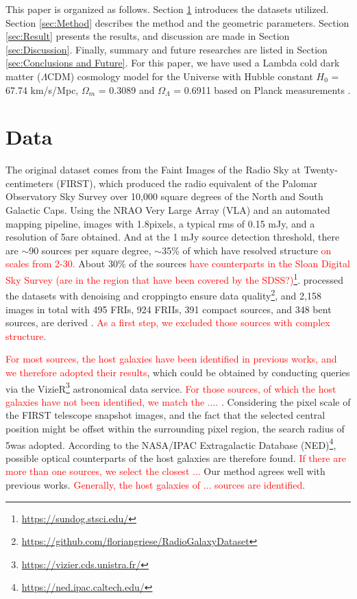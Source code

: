 \documentclass{aa}
\begin{document}
This paper is organized as follows. Section \ref{sec:Data} introduces the datasets utilized. Section \ref{sec:Method} describes the method and the geometric parameters. Section \ref{sec:Result} presents the results, and discussion are made in Section \ref{sec:Discussion}. Finally, summary and future researches are listed in Section \ref{sec:Conclusions and Future}.
For this paper, we have used a Lambda cold dark matter ($ \Lambda\text{CDM} $) cosmology model for the Universe with Hubble constant $H_{0}$ = 67.74 km/s/Mpc, $\Omega_m$ = 0.3089 and $\Omega_\Lambda$ = 0.6911 based on Planck measurements \citep{collaboration_planck_2016}.



\section{Data}\label{sec:Data}
The original dataset comes from the Faint Images of the Radio Sky at Twenty-centimeters (FIRST), 
which produced the radio equivalent of the Palomar Observatory Sky Survey over 10,000 square degrees of the North and South Galactic Caps.
Using the NRAO Very Large Array (VLA) and an automated mapping pipeline, images with 1.8\arcsec pixels, a typical rms of 0.15 mJy, and a resolution of 5\arcsec are obtained.
And at the 1 mJy source detection threshold, there are $\sim$90 sources per square degree, $\sim$35\% of which have resolved structure \textcolor{red}{on scales from 2-30\arcsec. }
About 30\% of the sources \textcolor{red}{have counterparts in the Sloan Digital Sky Survey (are in the region that have been covered by the SDSS?)}\footnote{\url{https://sundog.stsci.edu/}}. 
\cite{griese_first_2023} processed the datasets with denoising and cropping\textemdash to ensure data quality\footnote{\url{https://github.com/floriangriese/RadioGalaxyDataset}},
and 2,158 images in total with 495 FRIs, 924 FRIIs, 391 compact sources, and 348 bent sources, are derived \citep{griese_floriangrieseradiogalaxydataset_2022}. 
\textcolor{red}{As a first step, we excluded those sources with complex structure.}

\textcolor{red}{For most sources, the host galaxies have been identified in previous works, and we therefore adopted their results},
which could be obtained by conducting queries via the VizieR\footnote{\url{https://vizier.cds.unistra.fr/}} astronomical data service.
\textcolor{red}{For those sources, of which the host galaxies have not been identified, we match the .... }.
Considering the pixel scale of the FIRST telescope snapshot images, and the fact that the selected central position might be offset within the surrounding pixel region, the search radius of 5\arcsec was adopted. 
According to the NASA/IPAC Extragalactic Database (NED)\footnote{\url{https://ned.ipac.caltech.edu/}}, possible optical counterparts of the host galaxies are therefore found. 
\textcolor{red}{If there are more than one sources, we select the closest ... } 
Our method agrees well with previous works.
\textcolor{red}{Generally,  the host galaxies of  ... sources are identified}.
\end{document}
